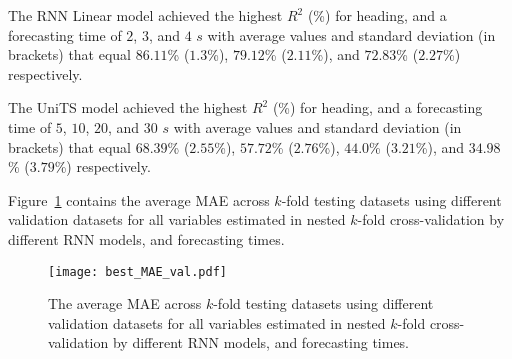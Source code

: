 \begin{table}[!ht]
	\centering
	\caption{The average $R^{2}$ (\%), with standard deviation in brackets, across $k$-fold validation datasets for the heading estimated on the $k$-fold testing datasets by different RNN models, and forecasting times.}
	\label{tab:best_direction_R2}
\end{table}

The RNN Linear model achieved the highest $R^{2}$ (\%) for heading, and a forecasting time of $2$, $3$, and $4$ $s$ with average values and standard deviation (in brackets) that equal $86.11$\% ($1.3$\%), $79.12$\% ($2.11$\%), and $72.83$\% ($2.27$\%) respectively.

The UniTS model achieved the highest $R^{2}$ (\%) for heading, and a forecasting time of $5$, $10$, $20$, and $30$ $s$ with average values and standard deviation (in brackets) that equal $68.39$\% ($2.55$\%), $57.72$\% ($2.76$\%), $44.0$\% ($3.21$\%), and $34.98$\% ($3.79$\%) respectively.

Figure~\ref{fig:best_MAE_val} contains the average MAE across $k$-fold testing datasets using different validation datasets for all variables estimated in nested $k$-fold cross-validation by different RNN models, and forecasting times.

\begin{figure}[!ht]
	\centering
	\texttt{[image: best\_MAE\_val.pdf]}
	\caption{The average MAE across $k$-fold testing datasets using different validation datasets for all variables estimated in nested $k$-fold cross-validation by different RNN models, and forecasting times.}
	\label{fig:best_MAE_val}
\end{figure}

